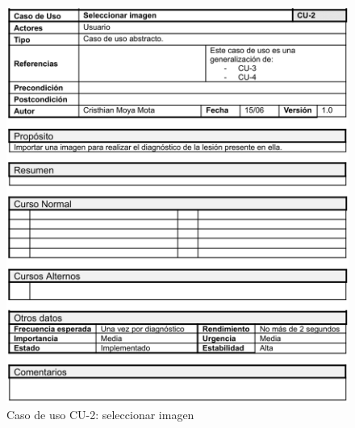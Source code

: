  \begin{figure}[H]
	\centering
	\includegraphics[scale=0.85]{imagenes/cu-2.png}
	\caption{Caso de uso CU-2: seleccionar imagen}
	\label{fig:cu2}
\end{figure}

